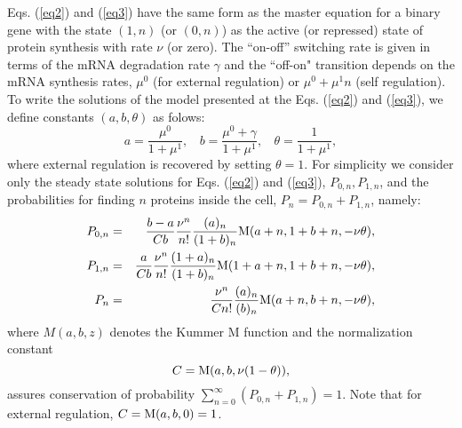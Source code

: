 Eqs. (\ref{eq2}) and (\ref{eq3}) have the same form as the master
equation for a binary gene with the state $(1,n)$ (or $(0,n)$) as the
active (or repressed) state of protein synthesis with rate $\nu$ (or
zero). The ``on-off'' switching rate is given in terms of the mRNA
degradation rate $\gamma$ and the ``off-on" transition depends on the
mRNA synthesis rates, $\mu^0$ (for external regulation) or $\mu^0 +
\mu^1 n$ (self regulation).  To write the solutions of the model
presented at the Eqs. (\ref{eq2}) and (\ref{eq3}), we define constants
$(a, b, \theta)$ as folows:
\begin{equation}
a = \frac{\mu^0}{1+\mu^1}, \ \ \ \
b = \frac{\mu^0+\gamma}{1+\mu^1}, \ \ \ \
\theta = \frac{1}{1+\mu^1},
\label{params}
\end{equation}
where external regulation is recovered by setting $\theta=1$.  For
simplicity we consider only the steady state solutions for
Eqs. (\ref{eq2}) and (\ref{eq3}), $P_{0,n}, P_{1,n}$, and the
probabilities for finding $n$ proteins inside the cell, $P_n= P_{0,n}
+ P_{1,n}$, namely:
\begin{eqnarray}
P_{0,n} &=&  \frac{b-a}{Cb}\frac{\nu^n}{n!} \frac{(a)_{n}}{(1+b)_{n}}
          {\rm M}(a+n, 1+b+n, -\nu \theta), \label{p0n} \\
P_{1,n} &=&  \frac{a}{Cb}\frac{\nu^n}{n!} \frac{(1+a)_{n}}{(1+b)_{n}}
          {\rm M}(1+a+n, 1+b+n, -\nu \theta), \label{p1n} \\
P_n    &=&  \frac{\nu^n}{Cn!} \frac{(a)_{n}}{(b)_{n}}
          {\rm M}(a+n, b+n, -\nu \theta), \label{phin}
\end{eqnarray}
where $M(a,b,z)$ denotes the Kummer M function \cite{abramowitz72} and
the normalization constant $$C={\rm M}(a, b, \nu(1-\theta)),$$ assures
conservation of probability
$\sum_{n=0}^{\infty}(P_{0,n}+P_{1,n})=1$. Note that for external
regulation, $C={\rm M}(a, b, 0) = 1$.

